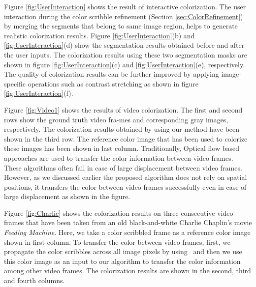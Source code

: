 \documentclass[twocolumn]{svjour3}          %
\begin{document}
Figure \ref{fig:UserInteraction} shows the result of interactive colorization. The user interaction during the color scribble refinement (Section \ref{sec:ColorRefinement}) by merging the segments that belong to same image region, helps to generate realistic colorization results. Figure \ref{fig:UserInteraction}(b) and \ref{fig:UserInteraction}(d) show the segmentation results obtained before and after the user inputs. The colorization results using these two segmentation masks are shown in figure \ref{fig:UserInteraction}(c) and \ref{fig:UserInteraction}(e), respectively. The quality of colorization results can be further improved by applying image-specific operations such as contrast stretching as shown in figure \ref{fig:UserInteraction}(f).

Figure \ref{fig:Video1} shows the results of video colorization. The first and second rows show the ground truth video fra-mes and corresponding gray images, respectively. The colorization results obtained by using our method have been shown in the third row. The reference color image that has been used to colorize these images has been shown in last column. Traditionally, Optical flow based approaches are used to transfer the color information between video frames. These algorithms often fail in case of large displacement between video frames. However, as we discussed earlier the proposed algorithm does not rely on spatial positions, it transfers the color between video frames successfully even in case of large displacement as shown in the figure.

Figure \ref{fig:Charlie} shows the colorization results on three consecutive video frames that have been taken from an old black-and-white Charlie Chaplin's movie \emph{Feeding Machine}. Here, we take a color scribbled frame as a reference color image shown in first column. To transfer the color between video frames, first, we propagate the color scribbles across all image pixels by using~\cite{Yatziv06} and then we use this color image as an input to our algorithm to transfer the color information among other video frames. The colorization results are shown in the second, third and fourth columns.
\end{document}
